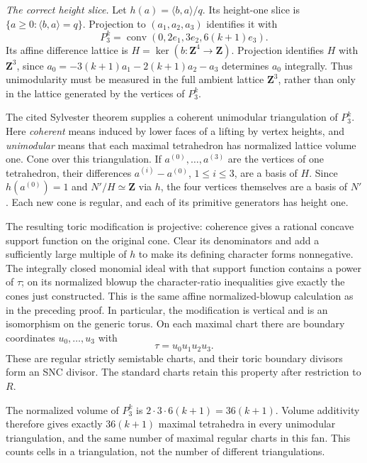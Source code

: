 \begin{example}
\emph{The correct height slice.}
Let $h(a)=\langle b,a\rangle/q$. Its height-one slice is
$\{a\ge0:\langle b,a\rangle=q\}$. Projection to $(a_1,a_2,a_3)$
identifies it with
\[
                 P_3^k=\operatorname{conv}
                  (0,2e_1,3e_2,6(k+1)e_3).
\]
Its affine difference lattice is $H=\ker(b:\mathbf Z^4\to\mathbf Z)$.
Projection identifies $H$ with $\mathbf Z^3$, since
$a_0=-3(k+1)a_1-2(k+1)a_2-a_3$ determines $a_0$ integrally.
Thus unimodularity must be measured in the full ambient lattice
$\mathbf Z^3$, rather than only in the lattice generated by the
vertices of $P_3^k$.

The cited Sylvester theorem supplies a coherent unimodular
triangulation of $P_3^k$. Here \emph{coherent} means induced by
lower faces of a lifting by vertex heights, and \emph{unimodular}
means that each maximal tetrahedron has normalized lattice volume one.
Cone over this triangulation. If $a^{(0)},\ldots,a^{(3)}$ are the
vertices of one tetrahedron, their differences
$a^{(i)}-a^{(0)}$, $1\le i\le3$, are a basis of $H$.
Since $h(a^{(0)})=1$ and $N'/H\simeq\mathbf Z$ via $h$, the four
vertices themselves are a basis of $N'$. Each new cone is regular,
and each of its primitive generators has height one.

The resulting toric modification is projective: coherence gives a
rational concave support function on the original cone. Clear its
denominators and add a sufficiently large multiple of $h$ to make
its defining character forms nonnegative. The integrally closed
monomial ideal with that support function contains a power of $\tau$;
on its normalized blowup the character-ratio inequalities give
exactly the cones just constructed. This is the same affine
normalized-blowup calculation as in the preceding proof. In particular,
the modification is vertical and is an isomorphism on the generic torus.
On each maximal chart there are boundary coordinates $u_0,\ldots,u_3$
with
\[
                              \tau=u_0u_1u_2u_3.
\]
These are regular strictly semistable charts, and their toric boundary
divisors form an SNC divisor. The standard charts retain this property
after restriction to $R$.

The normalized volume of $P_3^k$ is $2\cdot3\cdot6(k+1)=36(k+1)$.
Volume additivity therefore gives exactly $36(k+1)$ maximal tetrahedra
in every unimodular triangulation, and the same number of maximal
regular charts in this fan. This counts cells in a triangulation,
not the number of different triangulations.


\end{example}
